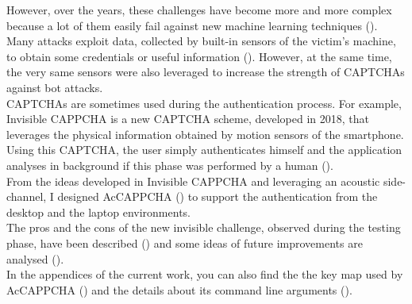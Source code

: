However, over the years, these challenges have become more and more complex because a lot of them easily fail against new machine learning techniques ().\\
Many attacks exploit data, collected by built-in sensors of the victim's machine, to obtain some credentials or useful information (). However, at the same time, the very same sensors were also leveraged to increase the strength of CAPTCHAs against bot attacks.\\
CAPTCHAs are sometimes used during the authentication process. For example, Invisible CAPPCHA is a new CAPTCHA scheme, developed in 2018, that leverages the physical information obtained by motion sensors of the smartphone\cite{Invisible_CAPPCHA}. Using this CAPTCHA, the user simply authenticates himself and the application analyses in background if this phase was performed by a human ().\\
From the ideas developed in Invisible CAPPCHA and leveraging an acoustic side-channel, I designed AcCAPPCHA () to support the authentication from the desktop and the laptop environments.\\
The pros and the cons of the new invisible challenge, observed during the testing phase, have been described () and some ideas of future improvements are analysed ().\\
In the appendices of the current work, you can also find the the key map used by AcCAPPCHA () and the details about its command line arguments ().